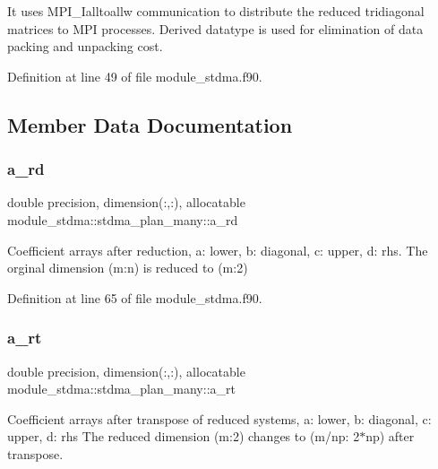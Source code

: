 It uses M\+P\+I\+\_\+\+Ialltoallw communication to distribute the reduced tridiagonal matrices to M\+PI processes. Derived datatype is used for elimination of data packing and unpacking cost. 

Definition at line 49 of file module\+\_\+stdma.\+f90.



\subsection{Member Data Documentation}
\mbox{\label{structmodule__stdma_1_1stdma__plan__many_a19015e9b58d0978af7f588430f31416c}} 
\subsubsection{\texorpdfstring{a\_rd}{a\_rd}}
{\footnotesize\ttfamily double precision, dimension(\+:,\+:), allocatable module\+\_\+stdma\+::stdma\+\_\+plan\+\_\+many\+::a\+\_\+rd}



Coefficient arrays after reduction, a\+: lower, b\+: diagonal, c\+: upper, d\+: rhs. The orginal dimension (m\+:n) is reduced to (m\+:2) 



Definition at line 65 of file module\+\_\+stdma.\+f90.

\mbox{\label{structmodule__stdma_1_1stdma__plan__many_ab67f78f6ca2a5c48d5a9d7b3128e37e9}} 
\subsubsection{\texorpdfstring{a\_rt}{a\_rt}}
{\footnotesize\ttfamily double precision, dimension(\+:,\+:), allocatable module\+\_\+stdma\+::stdma\+\_\+plan\+\_\+many\+::a\+\_\+rt}



Coefficient arrays after transpose of reduced systems, a\+: lower, b\+: diagonal, c\+: upper, d\+: rhs The reduced dimension (m\+:2) changes to (m/np\+: 2$\ast$np) after transpose. 



